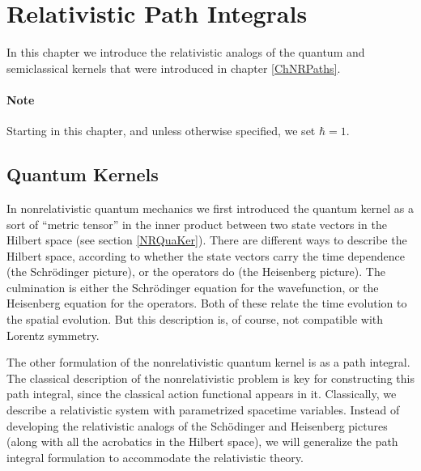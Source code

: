 \chapter{Relativistic Path Integrals\label{ChRelaPaths}}
In this chapter we introduce the relativistic analogs of the quantum and semiclassical kernels that were introduced in chapter \ref{ChNRPaths}.
\subsubsection{Note}
Starting in this chapter, and unless otherwise specified, we set $\hbar = 1$.
\section{Quantum Kernels}
In nonrelativistic quantum mechanics we first introduced the quantum kernel as a sort of ``metric tensor'' in the inner product between two state vectors in the Hilbert space (see section \ref{NRQuaKer}). There are different ways to describe the Hilbert space, according to whether the state vectors carry the time dependence (the Schr\"{o}dinger picture), or the operators do (the Heisenberg picture). The culmination is either the Schr\"{o}dinger equation for the wavefunction, or the Heisenberg equation for the operators. Both of these relate the time evolution to the spatial evolution. But this description is, of course, not compatible with Lorentz symmetry.

The other formulation of the nonrelativistic quantum kernel is as a path integral. The classical description of the nonrelativistic problem is key for constructing this path integral, since the classical action functional appears in it. Classically, we describe a relativistic system with parametrized spacetime variables. Instead of developing the relativistic analogs of the Sch\"{o}dinger and Heisenberg pictures (along with all the acrobatics in the Hilbert space), we will generalize the path integral formulation to accommodate the relativistic theory.

